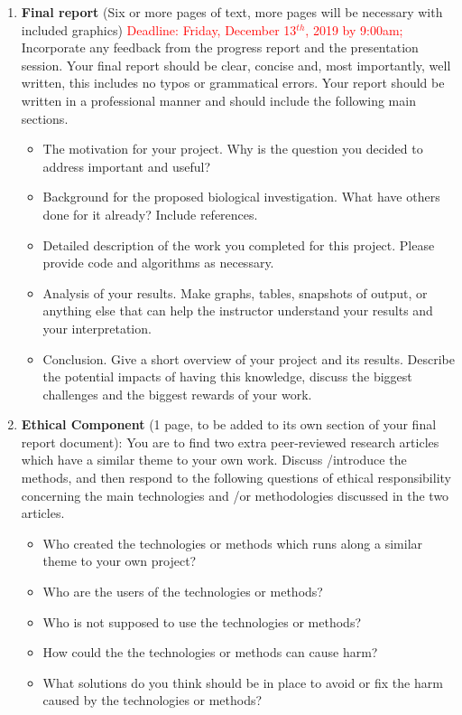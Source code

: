 \begin{enumerate}
\item \textbf{Final report} (Six or more pages of text, more pages will be necessary with included graphics) \textcolor{red}{Deadline: Friday, December 13$^{th}$, 2019 by 9:00am;} Incorporate any feedback from the progress report and the presentation session. Your final report should be clear, concise and, most importantly, well written, this includes no typos or grammatical errors. Your report should be written in a professional manner and should include the following main sections.

\begin{itemize}
	\item The motivation for your project. Why is the question you decided to address important and useful?
	\item Background for the proposed biological investigation. What have others done for it already? Include references.
	\item Detailed description of the work you completed for this project. Please provide code and algorithms as necessary.
	\item Analysis of your results. Make graphs, tables, snapshots of output, or anything else that can help the instructor understand your results and your interpretation.
	\item Conclusion. Give a short overview of your project and its results. Describe the potential impacts of having this knowledge, discuss the biggest challenges and the biggest rewards of your work. 
\end{itemize}
	

\item \textbf{Ethical Component} (1 page, to be added to its own section of your final report document): You are to find two extra peer-reviewed research articles which have a similar theme to your own work. Discuss /introduce the methods, and then respond to the following questions of ethical responsibility concerning the main technologies and /or methodologies discussed in the two articles.

\color{blue}
\begin{itemize}
	\item Who created the technologies or methods which runs along a similar theme to your own project?
	\item Who are the users of the technologies or methods?
	\item Who is not supposed to use the technologies or methods?
	\item How could the the technologies or methods can cause harm?
	\item What solutions do you think should be in place to avoid or fix the harm caused by the technologies or methods?
\end{itemize}
\color{black}

\end{enumerate}

